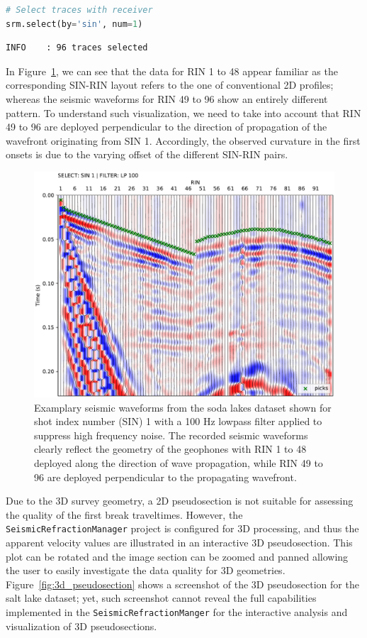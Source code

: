 \documentclass[a4paper,fleqn]{cas-sc}
\begin{document}
\begin{lstlisting}[language=Python, firstnumber=10]
# Select traces with receiver
srm.select(by='sin', num=1)
\end{lstlisting}
\begin{footnotesize}
\begin{verbatim}
INFO    : 96 traces selected
\end{verbatim}
\end{footnotesize}
In Figure~\ref{fig:3d_pickwindow}, we can see that the data for RIN 1 to 48 appear familiar as the corresponding SIN-RIN layout refers to the one of conventional 2D profiles; whereas the seismic waveforms for RIN 49 to 96 show an entirely different pattern. To understand such visualization, we need to take into account that RIN 49 to 96 are deployed perpendicular to the direction of propagation of the wavefront originating from SIN 1. Accordingly, the observed curvature in the first onsets is due to the varying offset of the different SIN-RIN pairs.
\begin{figure}
	\centering
	\includegraphics[width=.75\textwidth]{figures/sodalakes_sin1_lp100_picks_vd.pdf}
	\caption{Examplary seismic waveforms from the soda lakes dataset shown for shot index number (SIN) 1 with a 100 Hz lowpass filter applied to suppress high frequency noise. The recorded seismic waveforms clearly reflect the geometry of the geophones with RIN 1 to 48 deployed along the direction of wave propagation, while RIN 49 to 96 are deployed perpendicular to the propagating wavefront.}
	\label{fig:3d_pickwindow}
\end{figure}

Due to the 3D survey geometry, a 2D pseudosection is not suitable for assessing the quality of the first break traveltimes. However, the \texttt{SeismicRefractionManager} project is configured for 3D processing, and thus the apparent velocity values are illustrated in an interactive 3D pseudosection. This plot can be rotated and the image section can be zoomed and panned allowing the user to easily investigate the data quality for 3D geometries. Figure~\ref{fig:3d_pseudosection} shows a screenshot of the 3D pseudosection for the salt lake dataset; yet, such screenshot cannot reveal the full capabilities implemented in the \texttt{SeismicRefractionManger} for the interactive analysis and visualization of 3D pseudosections.
\end{document}
